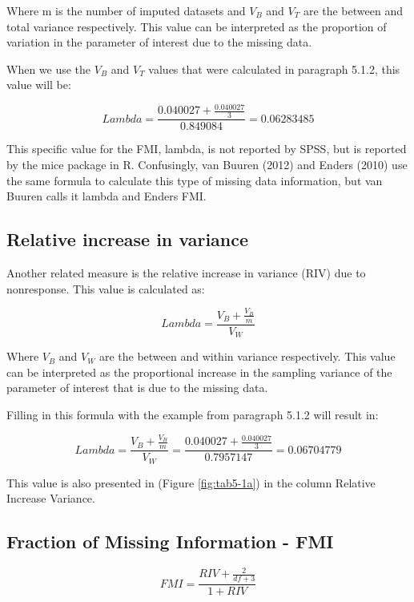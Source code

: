 \documentclass[]{book}
\theoremstyle{definition}
\theoremstyle{definition}
\theoremstyle{definition}
\theoremstyle{remark}
\begin{document}
Where m is the number of imputed datasets and \({V_B}\) and \({V_T}\)
are the between and total variance respectively. This value can be
interpreted as the proportion of variation in the parameter of interest
due to the missing data.

When we use the \({V_B}\) and \({V_T}\) values that were calculated in
paragraph 5.1.2, this value will be:

\[Lambda = \frac{0.040027 + \frac{0.040027}{3}}{0.849084}=0.06283485\]

This specific value for the FMI, lambda, is not reported by SPSS, but is
reported by the mice package in R. Confusingly, van Buuren (2012) and
Enders (2010) use the same formula to calculate this type of missing
data information, but van Buuren calls it lambda and Enders FMI.

\subsection{Relative increase in
variance}\label{relative-increase-in-variance}

Another related measure is the relative increase in variance (RIV) due
to nonresponse. This value is calculated as:

\begin{equation}
Lambda = \frac{V_B + \frac{V_B}{m}}{V_W}
  \label{eq:riv}
\end{equation}

Where \({V_B}\) and \({V_W}\) are the between and within variance
respectively. This value can be interpreted as the proportional increase
in the sampling variance of the parameter of interest that is due to the
missing data.

Filling in this formula with the example from paragraph 5.1.2 will
result in:

\[Lambda = \frac{V_B + \frac{V_B}{m}}{V_W}=\frac{0.040027 + \frac{0.040027}{3}}{0.7957147}=0.06704779\]

This value is also presented in (Figure \ref{fig:tab5-1a}) in the column
Relative Increase Variance.

\subsection{Fraction of Missing Information -
FMI}\label{fraction-of-missing-information---fmi}

\begin{equation}
FMI = \frac{RIV + \frac{2}{df+3}}{1+RIV}
  \label{eq:riv}
\end{equation}
\end{document}
